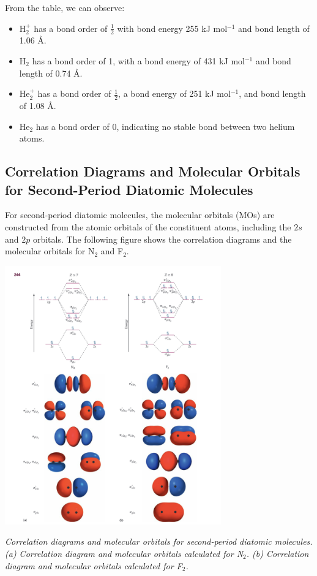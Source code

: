 \documentclass{report}
\begin{document}
From the table, we can observe:
\begin{itemize}
	\item H$_2^+$ has a bond order of $\frac{1}{2}$ with bond energy 255 kJ mol$^{-1}$ and bond length of 1.06 Å.
	\item H$_2$ has a bond order of 1, with a bond energy of 431 kJ mol$^{-1}$ and bond length of 0.74 Å.
	\item He$_2^+$ has a bond order of $\frac{1}{2}$, a bond energy of 251 kJ mol$^{-1}$, and bond length of 1.08 Å.
	\item He$_2$ has a bond order of 0, indicating no stable bond between two helium atoms.
\end{itemize}

\subsection{Correlation Diagrams and Molecular Orbitals for Second-Period Diatomic Molecules}

For second-period diatomic molecules, the molecular orbitals (MOs) are constructed from the atomic orbitals of the constituent atoms, including the $2s$ and $2p$ orbitals. The following figure shows the correlation diagrams and the molecular orbitals for N$_2$ and F$_2$.

\begin{center}
	\includegraphics[width=0.7\textwidth]{6.png}
\end{center}
\textit{Correlation diagrams and molecular orbitals for second-period diatomic molecules. (a) Correlation diagram and molecular orbitals calculated for N$_2$. (b) Correlation diagram and molecular orbitals calculated for F$_2$.}
\end{document}
